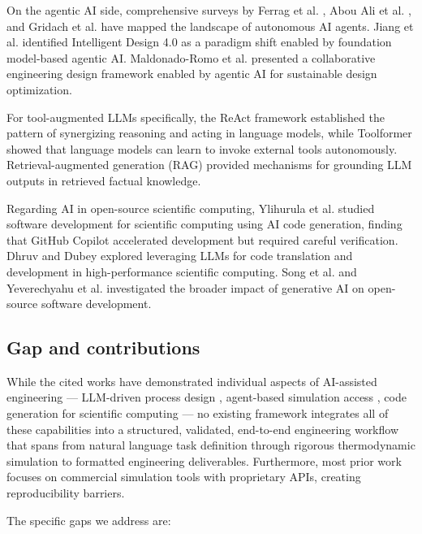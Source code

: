 \documentclass[review,3p]{elsarticle}
\begin{document}
On the agentic AI side, comprehensive surveys by Ferrag et al. \citep{Ferrag2025}, Abou Ali et al. \citep{AbouAli2025}, and Gridach et al. \citep{Gridach2025} have mapped the landscape of autonomous AI agents. Jiang et al. \citep{Jiang2025} identified Intelligent Design 4.0 as a paradigm shift enabled by foundation model-based agentic AI. Maldonado-Romo et al. \citep{MaldonadoRomo2026} presented a collaborative engineering design framework enabled by agentic AI for sustainable design optimization.

For tool-augmented LLMs specifically, the ReAct framework \citep{Yao2023} established the pattern of synergizing reasoning and acting in language models, while Toolformer \citep{Schick2024} showed that language models can learn to invoke external tools autonomously. Retrieval-augmented generation (RAG) \citep{Lewis2020} provided mechanisms for grounding LLM outputs in retrieved factual knowledge.

Regarding AI in open-source scientific computing, Ylihurula et al. \citep{Ylihurula2024} studied software development for scientific computing using AI code generation, finding that GitHub Copilot accelerated development but required careful verification. Dhruv and Dubey \citep{Dhruv2025} explored leveraging LLMs for code translation and development in high-performance scientific computing. Song et al. \citep{Song2024} and Yeverechyahu et al. \citep{Yeverechyahu2024} investigated the broader impact of generative AI on open-source software development.

\subsection{Gap and contributions}

While the cited works have demonstrated individual aspects of AI-assisted engineering --- LLM-driven process design \citep{Tian2026}, agent-based simulation access \citep{Liang2026}, code generation for scientific computing \citep{Ylihurula2024} --- no existing framework integrates all of these capabilities into a structured, validated, end-to-end engineering workflow that spans from natural language task definition through rigorous thermodynamic simulation to formatted engineering deliverables. Furthermore, most prior work focuses on commercial simulation tools with proprietary APIs, creating reproducibility barriers.

The specific gaps we address are:
\end{document}
